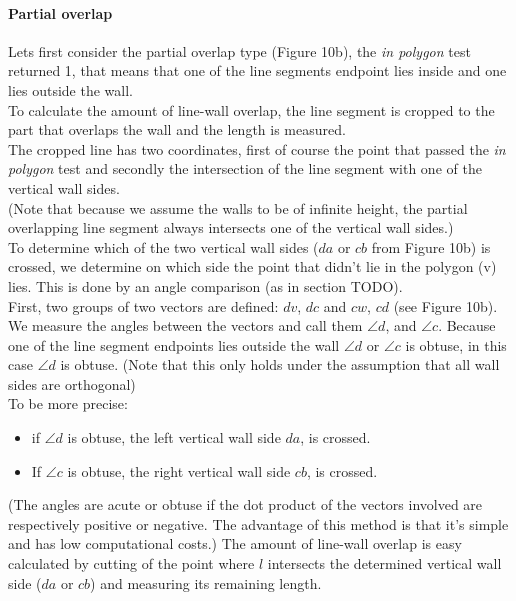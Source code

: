 \documentclass[10pt]{article}
\begin{document}
	\paragraph{Partial overlap}
	Lets first consider the partial overlap type (Figure 10b), the \emph{in polygon} test
	returned 1, that means that one of the line segments endpoint lies inside
	and one lies outside the wall.\\
	To calculate the amount of line-wall overlap, the line segment is cropped to the
	part that overlaps the wall and the length is measured.\\
	The cropped line has two coordinates, first of course the point that passed
	the \emph{in polygon} test and secondly the intersection of the line
	segment with one of the vertical wall sides.\\
	(Note that because we assume the walls to be of infinite height, the 
	partial overlapping line segment always intersects one of the
	vertical wall sides.)\\
	To determine which of the two vertical wall sides ($da$ or $cb$ from Figure 10b)
	 is crossed, we determine on which side the point that didn't lie in the polygon (v) lies.
	This is done by an angle comparison (as in section TODO).\\
	First, two groups of two vectors are defined: $dv$, $dc$ and $cw$, $cd$ (see Figure 10b).
	We measure the angles between the vectors and call them $\angle d$, and
	$\angle c$. 
	Because one of the line segment endpoints lies outside
	the wall $\angle d$ or $\angle c$ is obtuse, in this case $\angle d$ is obtuse.
	(Note that this only holds under the assumption that all wall sides are orthogonal)\\
	To be more precise: 
	\begin{itemize}
	\item if $\angle d$ is obtuse, the left vertical wall side $da$, is
	crossed. \\
	\item If $\angle c$ is obtuse, the right vertical wall side $cb$, is
	crossed. \\
	\end{itemize}
	(The angles are acute or obtuse if the dot product of the vectors involved
	are respectively positive or negative. The advantage of this method is that
	it's simple and has low computational costs.)
	The amount of line-wall overlap is easy calculated by cutting of the
	point where $l$ intersects the determined vertical wall side ($da$ or
	$cb$) and measuring its remaining length.
\end{document}
